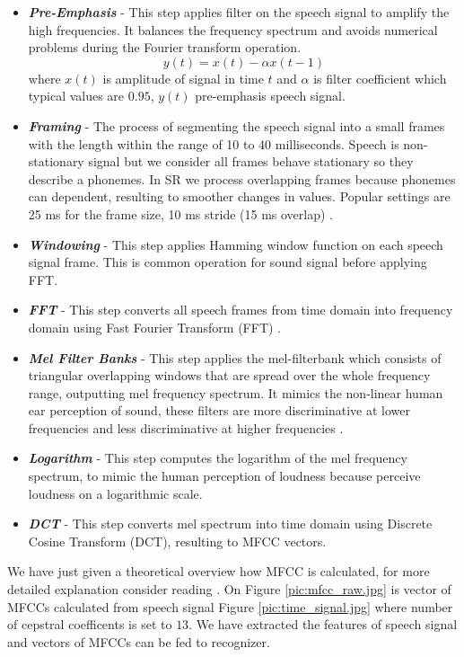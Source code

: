 \begin{itemize}
	\item \textit{\textbf{Pre-Emphasis}} - This step applies filter on the speech signal to amplify the high frequencies. It balances the frequency spectrum and avoids numerical problems during the Fourier transform operation.
    \[ y(t) = x(t) - {\alpha}x(t-1) \]
    where $x(t)$ is amplitude of signal in time $t$ and $\alpha$ is filter coefficient which typical values are $0.95$, $y(t)$ pre-emphasis speech signal.

	\item \textit{\textbf{Framing}} - The process of segmenting the speech signal into a small frames with the length within the range of 10 to 40 milliseconds.
  Speech is non-stationary signal but we consider all frames behave stationary so they describe a phonemes.
  In SR we process overlapping frames because phonemes can dependent, resulting to smoother changes in values.
  Popular settings are 25 ms for the frame size, 10 ms stride (15 ms overlap) \cite{signal_raw}.

  \item \textit{\textbf{Windowing}} - This step applies Hamming window function\cite{windowing} on each speech signal frame. This is common operation for sound signal before applying FFT.

  \item \textit{\textbf{FFT}} - This step converts all speech frames from time domain into frequency domain using Fast Fourier Transform (FFT) \cite{fft}.

  \item \textit{\textbf{Mel Filter Banks}} - This step applies the mel-filterbank which consists of triangular overlapping windows that are spread over the whole frequency range, outputting mel frequency spectrum.
	It mimics the non-linear human ear perception of sound, these filters are more discriminative at lower frequencies and less discriminative at higher frequencies \cite{mel_filter_banks}.

  \item \textit{\textbf{Logarithm}} - This step computes the logarithm of the mel frequency spectrum, to mimic the human perception of loudness because perceive loudness on a logarithmic scale.

  \item \textit{\textbf{DCT}} - This step converts mel spectrum into time domain using Discrete Cosine Transform (DCT)\cite{dcs}, resulting to MFCC vectors.

\end{itemize}
We have just given a theoretical overview how MFCC is calculated, for more detailed explanation consider reading \cite{mfcc_what}.
On Figure \ref{pic:mfcc_raw.jpg} is vector of MFCCs calculated from speech signal Figure \ref{pic:time_signal.jpg} where number of cepstral coefficents is set to $13$.
We have extracted the features of speech signal and vectors of MFCCs can be fed to recognizer.

